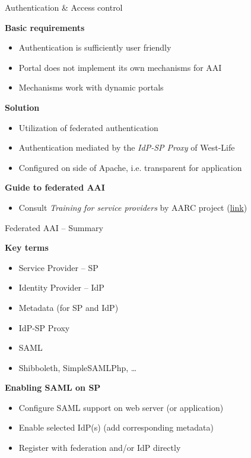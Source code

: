 \documentclass[smaller,t]{beamer}
\def\nadpis#1{\par\medskip\textbf{#1}}
\begin{document}
\begin{frame}{Authentication \& Access control}
\nadpis{Basic requirements}
\begin{itemize}
\item Authentication is sufficiently user friendly
\item Portal does not implement its own mechanisms for AAI
\item Mechanisms work with dynamic portals
\end{itemize}

\nadpis{Solution}
\begin{itemize}
\item Utilization of federated authentication
\item Authentication mediated by the \emph{IdP-SP Proxy} of West-Life
\item Configured on side of Apache, i.e. transparent for application
\end{itemize}

\nadpis{Guide to federated AAI}
\begin{itemize}
\item Consult \emph{Training for service providers} by AARC project
(\href{https://aarc-project.eu/workpackages/training-and-outreach/training-modules/training-for-service-provider-operators/}{link})
\end{itemize}

\end{frame}

\begin{frame}{Federated AAI -- Summary}
\nadpis{Key terms}
\begin{itemize}
\item Service Provider -- SP
\item Identity Provider -- IdP
\item Metadata (for SP and IdP)
\item IdP-SP Proxy
\item SAML
\item Shibboleth, SimpleSAMLPhp, \ldots
\end{itemize}

\nadpis{Enabling SAML on SP}
\begin{itemize}
\item Configure SAML support on web server (or application)
\item Enable selected IdP(s) (add corresponding metadata)
\item Register with federation and/or IdP directly
\end{itemize}
\end{frame}
\end{document}
